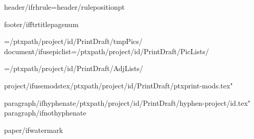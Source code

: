 \def\HeaderPosition{{{header/headerposition}}}
\def\FooterPosition{{{header/footerposition}}}
{header/ifrhrule}\RHruleposition={header/ruleposition}pt
\def\RangeSeparator{{\kern.1em\char"2013\kern.1em}} %
\def\ChapterVerseSeparator{{\kern.02em{header/chvseparator}\kern.02em}} %

\def\RHoddleft{{{header/oddleft}}}
\def\RHoddcenter{{{header/oddcenter}}}
\def\RHoddright{{{header/oddright}}}

\def\RHevenleft{{{header/evenleft}}}
\def\RHevencenter{{{header/evencenter}}}
\def\RHevenright{{{header/evenright}}}


\def\RFoddcenter{{{footer/oddcenter}}}
\def\RFevencenter{{{footer/oddcenter}}}
\def\RFtitlecenter{{{footer/oddcenter}}}
{footer/ifftrtitlepagenum}\def\RFtitlecenter{{\pagenumber}}

\PicPath={{{/ptxpath}/{project/id}/PrintDraft/tmpPics/}}
{document/ifusepiclist}\PicListPath={{{/ptxpath}/{project/id}/PrintDraft/PicLists/}}

\AdjListPath={{{/ptxpath}/{project/id}/PrintDraft/AdjLists/}}

\def\b{{\par\vskip\baselineskip}}
\let\pb=\pagebreak

{project/ifusemodstex}{/ptxpath}/{project/id}/PrintDraft/ptxprint-mods.tex"%


{paragraph/ifhyphenate}{/ptxpath}/{project/id}/PrintDraft/hyphen-{project/id}.tex"
{paragraph/ifnothyphenate}


{paper/ifwatermark}\def\PageBorder{{"{paper/watermarkpdf}"}}

